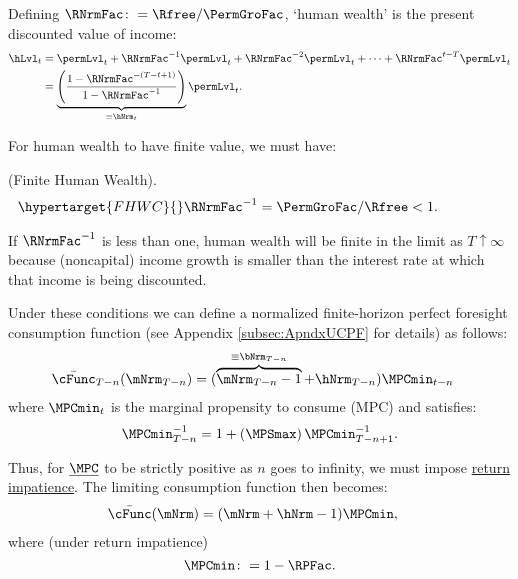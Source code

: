 \documentclass[BufferStockTheory]{subfiles}
\begin{document}
Defining $\RNrmFac \colon = \Rfree/\PermGroFac$, `human wealth' is the present discounted value of income:
%
% 
\begin{align}
  \hLvl_{t}  & = \permLvl_{t}+\RNrmFac^{-1} \permLvl_{t} + \RNrmFac^{-2} \permLvl_{t} + \cdots + \RNrmFac^{t-T} \permLvl_{t} \notag
  \\  & = \underbrace{\left(\frac{1-\RNrmFac^{-(T-t+1)}}{1-\RNrmFac^{-1}}\right)}_{\equiv \hNrm_{t}}\permLvl_{t} \label{eq:HDef}.
\end{align}

For human wealth to have finite value, we must have:
%
\begin{assumI}\label{ass:FHWC}(Finite Human Wealth).
\begin{align}\hypertarget{FHWC}{}
   \RNrmFac^{-1} = \PermGroFac/\Rfree  & < 1. \phantom{\text{{\FHWC}:~~}}\label{eq:FHWC2}
\end{align}
\end{assumI}
%
If $\RNrmFac^{-1}$ is less than one, human wealth will be finite in the limit as $T \uparrow \infty$ because (noncapital) income growth is smaller than the interest rate at which that income is being discounted.

Under these conditions we can define a normalized finite-horizon perfect foresight consumption function (see Appendix \ref{subsec:ApndxUCPF} for details) as follows:\hypertarget{MPCminDefn}{}
%
%
\begin{align*}
  \bar{\cFunc}_{T-n}(\mNrm_{T-n})  & = (\overbrace{\mNrm_{T-n}-1}^{
                                     \equiv\bNrm_{T-n}}+\hNrm_{T-n})\MPCmin_{t-n}
\end{align*}
%
%
where $\MPCmin_{t}$ is the marginal propensity to consume (MPC) and satisfies:
%
\begin{align}\label{eq:MPCminInv}
\MPCmin_{T-n}^{-1}  = 1+\left(\MPSmax\right) \MPCmin_{T-n+1}^{-1}.
\end{align}
%

Thus, for $\underline{\MPC}$ to be strictly positive as $n$ goes to infinity, we must impose \hyperlink{RIC}{return impatience}. The limiting consumption function then becomes:
%
%
\begin{align}\label{eq:cFuncPFUnc}
  \bar{\cFunc}(\mNrm)  & = (\mNrm+\hNrm-1)\MPCmin,
\end{align}
%
where (under return impatience) 
%
%
\begin{equation}
\MPCmin \colon = 1-\RPFac.
\end{equation}
%
%
%
\end{document}
